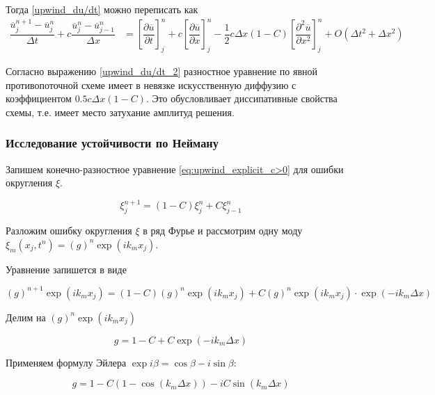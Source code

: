 Тогда \eqref{upwind_du/dt} можно переписать как 
\begin{equation} \label{upwind_du/dt_2}
\begin{split}
	\dfrac{\overline{u}_j^{n+1} - \overline{u}_j^n}{\Delta t} + c \dfrac{\overline{u}_j^{n} - \overline{u}_{j-1}^n}{\Delta x} &= 
	\left[ \dfrac{\partial \overline{u}}{\partial t} \right]_j^n + c \left[ \dfrac{\partial \overline{u}}{\partial x} \right]_j^n - \dfrac{1}{2} c  \Delta x (1 - C) \left[ \dfrac{\partial^2 \overline{u}}{\partial x^2} \right]_j^n + O(\Delta t^2 + \Delta x^2)
\end{split}
\end{equation}

Согласно выражению \eqref{upwind_du/dt_2} разностное уравнение по явной противопоточной схеме имеет в невязке искусственную диффузию с коэффициентом $0.5 c \Delta x (1 - C)$. Это обусловливает диссипативные свойства схемы, т.е. имеет место затухание амплитуд решения.

\subsubsection{Исследование устойчивости по Нейману}

Запишем конечно-разностное уравнение \eqref{eq:upwind_explicit_c>0} для ошибки округления $\xi$.

\begin{equation} \label{upwind_neuman: eq_xi}
	\xi_j^{n+1} = (1 - C) \xi_j^n + C \xi_{j-1}^n
\end{equation}

Разложим ошибку округления $\xi$ в ряд Фурье и рассмотрим одну моду $\xi_m (x_j, t^n) = (g)^n \exp (i k_m x_j)$.

Уравнение запишется в виде

\begin{equation} \label{upwind_neuman: eq_g_1}
	(g)^{n+1} \exp{(i k_m x_j)} = (1 - C) (g)^n \exp{(i k_m x_j)} +  C (g)^n \exp{(i k_m x_j)} \cdot \exp{(-i k_m \Delta x)}
\end{equation}

Делим на $(g)^n \exp{(i k_m x_j)}$

\begin{equation} \label{upwind_neuman: eq_g_2}
	g = 1 - C +  C \exp{(-i k_m \Delta x)}
\end{equation}

Применяем формулу Эйлера $\exp{i \beta} = \cos \beta - i \sin \beta$:

\begin{equation} \label{upwind_neuman: eq_g_final}
	g = 1 - C(1 - \cos (k_m \Delta x)) - i C \sin (k_m \Delta x)
\end{equation}

